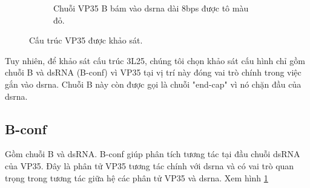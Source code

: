 \documentclass[12pt,a4paper,reqno, oneside]{book}
\begin{document}
\begin{figure}[t!]
\begin{subfigure}{0.5\textheight}
		\vspace{-50pt}
		\caption{Chuỗi VP35 B bám vào \gls{dsrna} dài 8bps được tô màu đỏ.}
		\label{fig:vp35b}
		\end{subfigure}
		\caption{Cấu trúc VP35 được khảo sát.}
		\label{fig:3l25}
		\end{figure}
		Tuy nhiên, để khảo sát cấu trúc 3L25, chúng tôi chọn khảo sát cấu hình chỉ gồm chuỗi B và dsRNA (B-conf) vì VP35 tại vị trí này đóng vai trò chính trong việc gắn vào \gls{dsrna}\cite{Kimberlin2010}. Chuỗi B này còn được gọi là chuỗi "end-cap" vì nó chặn đầu của \gls{dsrna}\cite{Leung2010}.
%	

%	
%
		
	\subsection{B-conf}
	
		Gồm chuỗi B và dsRNA. B-conf giúp phân tích tương tác tại đầu chuỗi dsRNA của VP35. Đây là phân tử VP35 tương tác chính với \gls{dsrna} và có vai trò quan trọng trong tương tác giữa hệ các phân tử VP35 và \gls{dsrna}. Xem hình \ref{fig:vp35b}
\end{document}
